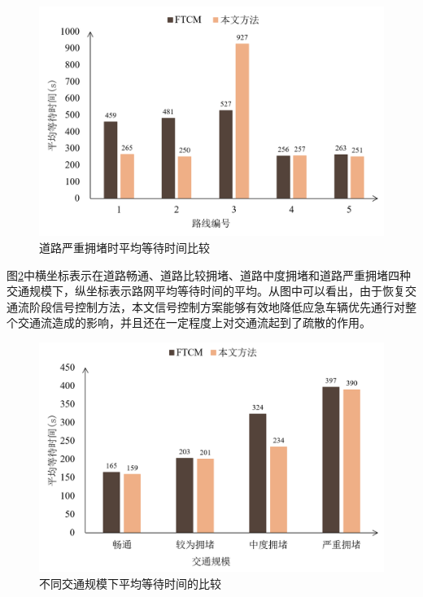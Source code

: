 \begin{figure}[H]
	\centering
	\includegraphics[width=\linewidth]{figures/awt4.png}
	\caption{道路严重拥堵时平均等待时间比较}
	\label{fig:waiting_severely_congestion}
\end{figure}

图\ref{fig:awt_conclude}中横坐标表示在道路畅通、道路比较拥堵、道路中度拥堵和道路严重拥堵四种交通规模下，纵坐标表示路网平均等待时间的平均。从图中可以看出，由于恢复交通流阶段信号控制方法，本文信号控制方案能够有效地降低应急车辆优先通行对整个交通流造成的影响，并且还在一定程度上对交通流起到了疏散的作用。

\begin{figure}[H]
	\centering
	\includegraphics[width=\linewidth]{figures/awt_conclude.png}
	\caption{不同交通规模下平均等待时间的比较}
	\label{fig:awt_conclude}
\end{figure}

